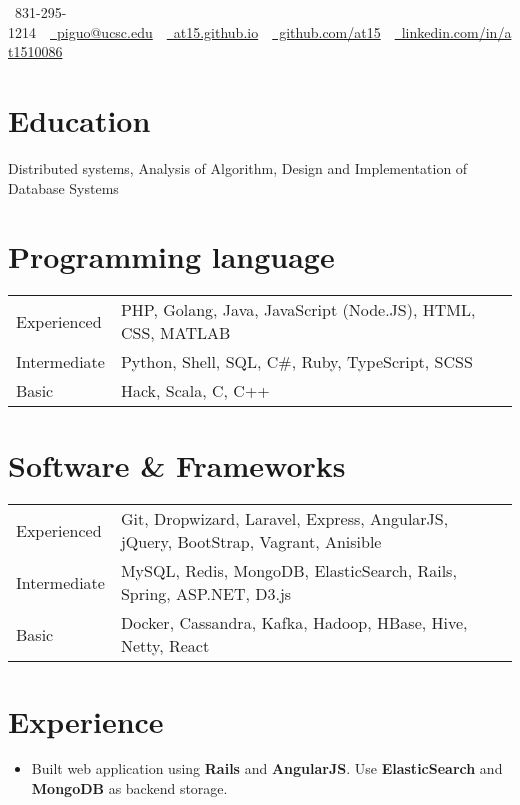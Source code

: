 \documentclass[10pt, letterpaper]{simple-cv}
\begin{document}
\centerline{\faMobile\ 831-295-1214\ \
\href{mailto:piguo@ucsc.edu}{\faEnvelope\ piguo@ucsc.edu}\ \
\href{https://at15.github.io}{\faHome\ at15.github.io}\ \
\href{https://github.com/at15}{\faGithubSquare\ github.com/at15}\ \
\href{https://www.linkedin.com/in/at1510086}{\faLinkedinSquare\ linkedin.com/in/at1510086}}

\section{Education}
Distributed systems, Analysis of Algorithm, Design and Implementation of Database Systems

\section{Programming language}
\begin{tabular}{ l l }
 Experienced &  PHP, Golang, Java, JavaScript (Node.JS), HTML, CSS, MATLAB \\
 Intermediate & Python, Shell, SQL, C\#, Ruby, TypeScript, SCSS \\
 Basic & Hack, Scala, C, C++
\end{tabular}

\section{Software \& Frameworks}
\begin{tabular}{ l l }
 Experienced & Git, Dropwizard, Laravel, Express, AngularJS, jQuery, BootStrap, Vagrant, Anisible\\
 Intermediate & MySQL, Redis, MongoDB, ElasticSearch, Rails, Spring, ASP.NET, D3.js \\
 Basic & Docker, Cassandra, Kafka, Hadoop, HBase, Hive, Netty, React
\end{tabular}

\section{Experience}

\begin{itemize}
\item Built web application using \textbf{Rails} and \textbf{AngularJS}. Use \textbf{ElasticSearch} and \textbf{MongoDB} as backend storage.
\end{itemize}
\end{document}
